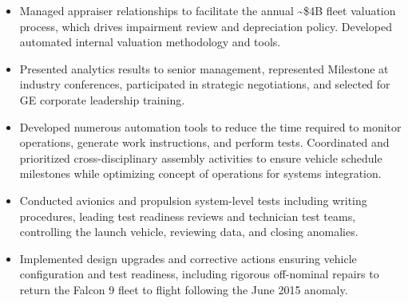 \documentclass[11pt,letterpaper,sans]{moderncv} %
\begin{document}
\vspace{-1.5\baselineskip}
\begin{itemize}
\item Managed appraiser relationships to facilitate the annual \textasciitilde\$4B fleet valuation process, which drives impairment review and depreciation policy.  Developed automated internal valuation methodology and tools.
\item Presented analytics results to senior management, represented Milestone at industry conferences, participated in strategic negotiations, and selected for GE corporate leadership training.
\end{itemize}



\vspace{6pt}


\begin{itemize}
\item Developed numerous automation tools to reduce the time required to monitor operations, generate work instructions, and perform tests. Coordinated and prioritized cross-disciplinary assembly activities to ensure vehicle schedule milestones while optimizing concept of operations for systems integration.
\item Conducted avionics and propulsion system-level tests including writing procedures, leading test readiness reviews and technician test teams, controlling the launch vehicle, reviewing data, and closing anomalies.
\item Implemented design upgrades and corrective actions ensuring vehicle configuration and test readiness, including rigorous off-nominal repairs to return the Falcon 9 fleet to flight following the June 2015 anomaly.
\end{itemize}
\vspace{6pt}


\end{document}
